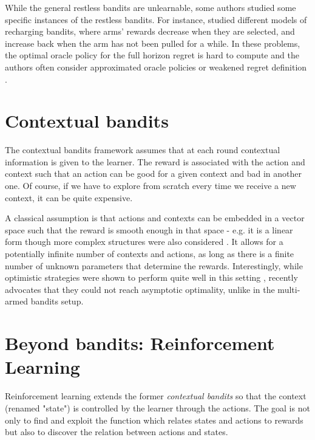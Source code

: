 {While the general restless bandits are unlearnable, some authors studied some specific instances of the restless bandits. For instance,  \citet{immorlica2018recharging, pikeburke2019recovering, cella2020stochastic} studied different models of recharging bandits, where arms' rewards decrease when they are selected, and increase back when the arm has not been pulled for a while. In these problems, the optimal oracle policy for the full horizon regret is hard to compute and the authors often consider approximated oracle policies \citep{immorlica2018recharging, cella2020stochastic} or weakened regret definition \citep{pikeburke2019recovering}.

\section{Contextual bandits}
\label{sec:contextual}
The contextual bandits framework \citep{tewari2017contextual} assumes that at each round contextual information is given to the learner. The reward is associated with the action and context such that an action can be good for a given context and bad in another one. Of course, if we have to explore from scratch every time we receive a new context, it can be quite expensive. 

A classical assumption is that actions and contexts can be embedded in a vector space such that the reward is smooth enough in that space - e.g. it is a linear form \citep{abe1999associative, auer2002using, abbasi2011improved, lattimore2017end} though more complex structures were also considered \citep{filippi2010parametric, valko2013finite, valko2014spectral}. It allows for a potentially infinite number of contexts and actions, as long as there is a finite number of unknown parameters that determine the rewards. Interestingly, while optimistic strategies were shown to perform quite well in this setting \citep{abbasi2011improved}, \citet{lattimore2017end} recently advocates that they could not reach asymptotic optimality, unlike in the multi-armed bandits setup. 

\section{Beyond bandits: Reinforcement Learning}
\label{sec:rl}
Reinforcement learning \citep{sutton1998book} extends the former \emph{contextual bandits} so that the context (renamed "state") is controlled by the learner through the actions. The goal is not only to find and exploit the function which relates states and actions to rewards but also to discover the relation between actions and states.

}
